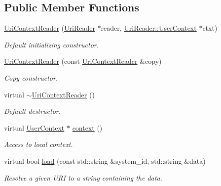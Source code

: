 \subsection*{Public Member Functions}
\begin{DoxyCompactItemize}
\item 
\hyperlink{class_d_d4hep_1_1_x_m_l_1_1_uri_context_reader_aede2321d47f8d747c084287e367b35ac}{Uri\+Context\+Reader} (\hyperlink{class_d_d4hep_1_1_x_m_l_1_1_uri_reader}{Uri\+Reader} $\ast$reader, \hyperlink{struct_d_d4hep_1_1_x_m_l_1_1_uri_reader_1_1_user_context}{Uri\+Reader\+::\+User\+Context} $\ast$ctxt)
\begin{DoxyCompactList}\small\item\em Default initializing constructor. \end{DoxyCompactList}\item 
\hyperlink{class_d_d4hep_1_1_x_m_l_1_1_uri_context_reader_ae8808c053cfc81ddff19c1be89f95e6e}{Uri\+Context\+Reader} (const \hyperlink{class_d_d4hep_1_1_x_m_l_1_1_uri_context_reader}{Uri\+Context\+Reader} \&copy)
\begin{DoxyCompactList}\small\item\em Copy constructor. \end{DoxyCompactList}\item 
virtual \hyperlink{class_d_d4hep_1_1_x_m_l_1_1_uri_context_reader_a065124ec7d3af30801bf471ed4259690}{$\sim$\+Uri\+Context\+Reader} ()
\begin{DoxyCompactList}\small\item\em Default destructor. \end{DoxyCompactList}\item 
virtual \hyperlink{struct_d_d4hep_1_1_x_m_l_1_1_uri_reader_1_1_user_context}{User\+Context} $\ast$ \hyperlink{class_d_d4hep_1_1_x_m_l_1_1_uri_context_reader_ad7ba7d778fdc8df96cca1e298003a403}{context} ()
\begin{DoxyCompactList}\small\item\em Access to local context. \end{DoxyCompactList}\item 
virtual bool \hyperlink{class_d_d4hep_1_1_x_m_l_1_1_uri_context_reader_a1a6ca7eb85dadbc69463a367f396fe72}{load} (const std\+::string \&system\+\_\+id, std\+::string \&data)
\begin{DoxyCompactList}\small\item\em Resolve a given U\+RI to a string containing the data. \end{DoxyCompactList}\item 

\end{DoxyCompactItemize}
